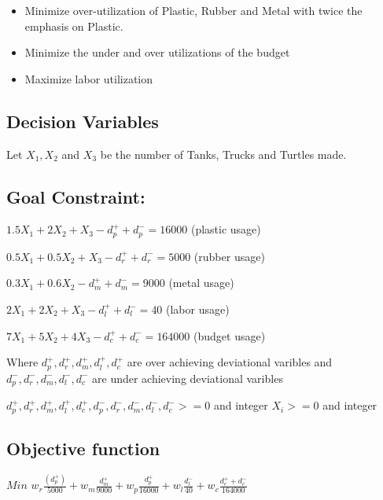 \documentclass[]{article}
\providecommand{\tightlist}{%
  \setlength{\itemsep}{0pt}\setlength{\parskip}{0pt}}
\begin{document}
\begin{itemize}
\tightlist
\item
  Minimize over-utilization of Plastic, Rubber and Metal with twice the
  emphasis on Plastic.
\item
  Minimize the under and over utilizations of the budget
\item
  Maximize labor utilization
\end{itemize}

\subsection{Decision Variables}\label{decision-variables-2}

Let \(X_{1}, X_{2}\) and \(X_{3}\) be the number of Tanks, Trucks and
Turtles made.

\subsection{Goal Constraint:}\label{goal-constraint}

\(1.5X_{1} + 2X_{2} + X_{3} - d_{p}^{+} + d_{p}^{-} = 16000\) (plastic
usage)

\(0.5X_{1} + 0.5X_{2} + X_{3} - d_{r}^{+} + d_{r}^{-} = 5000\) (rubber
usage)

\(0.3X_{1} + 0.6X_{2} - d_{m}^{+} + d_{m}^{-} = 9000\) (metal usage)

\(2X_{1} + 2X_{2} + X_{3} - d_{l}^{+} + d_{l}^{-} = 40\) (labor usage)

\(7X_{1} + 5X_{2} + 4X_{3} - d_{c}^{+} + d_{c}^{-} = 164000\) (budget
usage)

Where \(d_{p}^{+},d_{r}^{+},d_{m}^{+},d_{l}^{+},d_{c}^{+}\) are over
achieving deviational varibles and
\(d_{p}^{-},d_{r}^{-},d_{m}^{-},d_{l}^{-},d_{c}^{-}\) are under
achieving deviational varibles

\(d_{p}^{+},d_{r}^{+},d_{m}^{+},d_{l}^{+},d_{c}^{+},d_{p}^{-},d_{r}^{-},d_{m}^{-},d_{l}^{-},d_{c}^{-} >= 0\)
and integer \(X_{i} >= 0\) and integer

\subsection{Objective function}\label{objective-function-2}

\(Min\)
\(w_{r}\frac {(d_{p}^{+})}{5000} + w_{m} \frac {d_{m}^{+}}{9000} + w_{p} \frac {d_{p}^{+}}{16000} + w_{l}\frac{d_{l}^{-}}{40} + w_{c}\frac{d_{c}^{+}+d_{c}^{-}}{164000}\)
\end{document}
